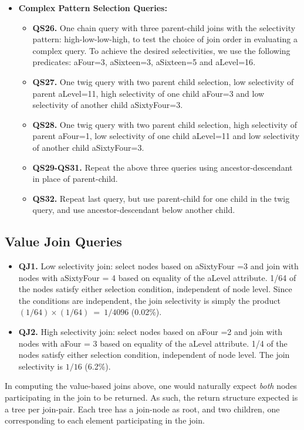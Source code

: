 \begin{itemize}
\item {\bf Complex Pattern Selection Queries:}
\begin {itemize}
\item {\bf QS26.} One chain query with three parent-child joins with the selectivity pattern: high-low-low-high, to test the choice of join order in evaluating a complex query. To achieve the desired selectivities, we use the following predicates:  {\sf aFour=3}, {\sf aSixteen=3}, {\sf aSixteen=5} and {\sf aLevel=16}.
\item {\bf QS27.} One twig query with two parent child selection, low selectivity of parent {\sf aLevel=11}, high selectivity of one child {\sf aFour=3} and low selectivity of another child {\sf aSixtyFour=3}.
\item {\bf QS28.} One twig query with two parent child selection, high selectivity of
parent {\sf aFour=1}, low selectivity of one child {\sf aLevel=11} and low
selectivity of another child {\sf aSixtyFour=3}.
\item
{\bf QS29-QS31.} Repeat the above three queries using ancestor-descendant in place of
parent-child.
\item
{\bf QS32.} Repeat last query, but use parent-child for one child in the twig query, and use ancestor-descendant below another child.
\end {itemize}
\end {itemize}

\subsection{Value Join Queries}
\begin {itemize}
\item {\bf QJ1.} Low selectivity join: select nodes based on {\sf aSixtyFour =3}
and join with nodes with {\sf aSixtyFour = 4} based on equality of the {\sf
aLevel} attribute.  1/64 of the nodes satisfy either selection condition,
independent of node level.  Since the conditions are independent, the join
selectivity is simply the product $(1/64) \times (1/64) ~=~ 1/4096$ (0.02\%).
\item {\bf QJ2.} High selectivity join: select nodes based on {\sf aFour =2} and
join with nodes with {\sf aFour = 3} based on equality of the {\sf aLevel}
attribute.  1/4 of the nodes satisfy either selection condition,
independent of node level.  The join selectivity is $1/16$ (6.2\%).
\end {itemize}
In computing the value-based joins above, one would naturally expect {\em
both} nodes participating in the join to be returned.  As such, the return
structure expected is a tree per join-pair.  Each tree has a join-node as
root, and two children, one corresponding to each element participating in
the join.

